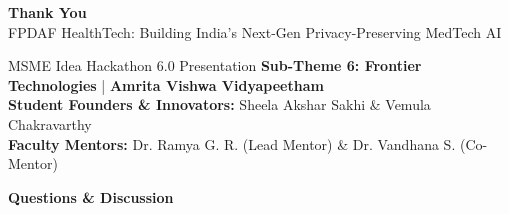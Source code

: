 \documentclass[aspectratio=169, 11pt]{beamer}
\begin{document}
\begin{frame}[plain]
    
    \centering
    \vspace{0.8cm}
    {\Huge \textbf{\textcolor{neonCyan}{Thank You}}} \\
    \vspace{0.2cm}
    {\large \textcolor{textColor!80}{FPDAF HealthTech: Building India's Next-Gen Privacy-Preserving MedTech AI}} \\
    \vspace{0.5cm}
    
    \begin{minipage}{0.8\textwidth}
        \begin{block}{MSME Idea Hackathon 6.0 Presentation}
            \centering
            \scriptsize
            \textbf{Sub-Theme 6: Frontier Technologies} \quad | \quad \textbf{Amrita Vishwa Vidyapeetham}\\
            \vspace{0.1cm}
            \textcolor{textColor}{\textbf{Student Founders \& Innovators:} Sheela Akshar Sakhi \& Vemula Chakravarthy}\\
            \textcolor{mutedText}{\textbf{Faculty Mentors:} Dr. Ramya G. R. (Lead Mentor) \& Dr. Vandhana S. (Co-Mentor)}
        \end{block}
    \end{minipage}
    
    \vspace{0.3cm}
    {\normalsize \textcolor{neonTeal}{\textbf{Questions \& Discussion}}}
\end{frame}
\end{document}
